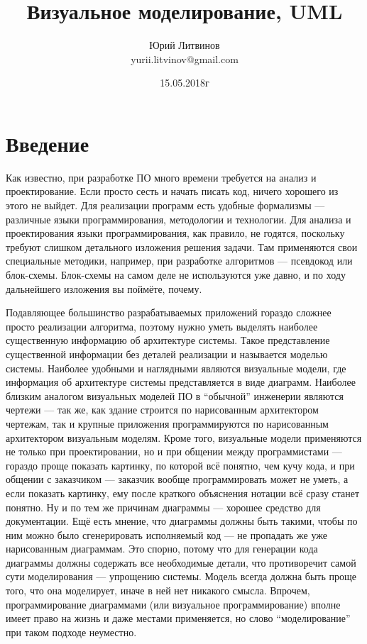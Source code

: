 \documentclass[a5paper]{article}
\title{Визуальное моделирование, UML}
\author{Юрий Литвинов\\\small{yurii.litvinov@gmail.com}}
\date{15.05.2018г}
\begin{document}
\maketitle
\thispagestyle{empty}

\section{Введение}

Как известно, при разработке ПО много времени требуется на анализ и проектирование. Если просто сесть и начать писать код, ничего хорошего из этого не выйдет. Для реализации программ есть удобные формализмы --- различные языки программирования, методологии и технологии. Для анализа и проектирования языки программирования, как правило, не годятся, поскольку требуют слишком детального изложения решения задачи. Там применяются свои специальные методики, например, при разработке алгоритмов --- псевдокод или блок-схемы. Блок-схемы на самом деле не используются уже давно, и по ходу дальнейшего изложения вы поймёте, почему.

Подавляющее большинство разрабатываемых приложений гораздо сложнее просто реализации алгоритма, поэтому нужно уметь выделять наиболее существенную информацию об архитектуре системы. Такое представление существенной информации без деталей реализации и называется моделью системы. Наиболее удобными и наглядными являются визуальные модели, где информация об архитектуре системы представляется в виде диаграмм. Наиболее близким аналогом визуальных моделей ПО в ``обычной'' инженерии являются чертежи --- так же, как здание строится по нарисованным архитектором чертежам, так и крупные приложения программируются по нарисованным архитектором визуальным моделям. Кроме того, визуальные модели применяются не только при проектировании, но и при общении между программистами --- гораздо проще показать картинку, по которой всё понятно, чем кучу кода, и при общении с заказчиком --- заказчик вообще программировать может не уметь, а если показать картинку, ему после краткого объяснения нотации всё сразу станет понятно. Ну и по тем же причинам диаграммы --- хорошее средство для документации. Ещё есть мнение, что диаграммы должны быть такими, чтобы по ним можно было сгенерировать исполняемый код --- не пропадать же уже нарисованным диаграммам. Это спорно, потому что для генерации кода диаграммы должны содержать все необходимые детали, что противоречит самой сути моделирования --- упрощению системы. Модель всегда должна быть проще того, что она моделирует, иначе в ней нет никакого смысла. Впрочем, программирование диаграммами (или визуальное программирование) вполне имеет право на жизнь и даже местами применяется, но слово ``моделирование'' при таком подходе неуместно.
\end{document}
